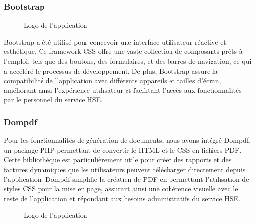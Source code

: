 \documentclass[a4paper,12pt]{report}
\begin{document}
\subsubsection{Bootstrap}
\begin{figure}[H]
    \centering
    \caption{Logo de l'application}
\end{figure}

Bootstrap a été utilisé pour concevoir une interface utilisateur réactive et esthétique. Ce framework CSS offre une vaste collection de composants prêts à l'emploi, tels que des boutons, des formulaires, et des barres de navigation, ce qui a accéléré le processus de développement. De plus, Bootstrap assure la compatibilité de l'application avec différents appareils et tailles d'écran, améliorant ainsi l'expérience utilisateur et facilitant l'accès aux fonctionnalités par le personnel du service HSE.

\subsubsection{Dompdf}

Pour les fonctionnalités de génération de documents, nous avons intégré Dompdf, un package PHP permettant de convertir le HTML et le CSS en fichiers PDF. Cette bibliothèque est particulièrement utile pour créer des rapports et des factures dynamiques que les utilisateurs peuvent télécharger directement depuis l'application. Dompdf simplifie la création de PDF en permettant l’utilisation de styles CSS pour la mise en page, assurant ainsi une cohérence visuelle avec le reste de l’application et répondant aux besoins administratifs du service HSE.

\vspace{1cm}
\begin{figure}[H]
    \centering
    \caption{Logo de l'application}
\end{figure}
\end{document}
